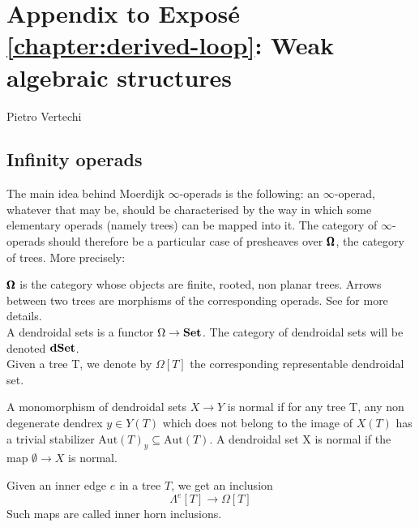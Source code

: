 \chapter*{Appendix to Expos\'e \ref{chapter:derived-loop}: Weak algebraic structures}
\begin{flushright}
  Pietro Vertechi
\end{flushright}

\begin{refsection}

\label{weak structures}

\setcounter{section}{0}
\renewcommand{\thesection}{\thechapter.\Alph{section}}
\section{Infinity operads}

The main idea behind Moerdijk $\infty$-operads is the following: an $\infty$-operad, whatever that may be, should be characterised by the way in which some elementary operads (namely trees) can be mapped into it. The category of $\infty$-operads should therefore be a particular case of presheaves over $\pmb{\Omega}$, the category of trees. More precisely:

\begin{definition}
$\pmb{\Omega}$ is the category whose objects are finite, rooted, non planar trees. Arrows between two trees are morphisms of the corresponding operads. See \cite{Mo-We}
for more details.\\
A dendroidal sets is a functor $\Omega\to \mathbf{Set}$. The category of dendroidal sets will be denoted $\mathbf{dSet}$.\\
Given a tree T, we denote by $\Omega[T]$ the corresponding representable dendroidal set.
\end{definition}

\begin{definition}[\cite{Mo-We}]
A monomorphism of dendroidal sets $X\to Y$ is normal if for any tree T, any non degenerate dendrex $y \in Y (T)$ which does not belong to the image of $X(T)$ has a trivial stabilizer $\mathrm{Aut}(T)_y \subseteq \mathrm{Aut}(T)$. A dendroidal set X is normal if the map $\emptyset\to X$ is normal.
\end{definition}

Given an inner edge $e$ in a tree $T$, we get an inclusion
\[
\Lambda^e[T]\to \Omega[T]
\]
Such maps are called inner horn inclusions.


\end{refsection}
